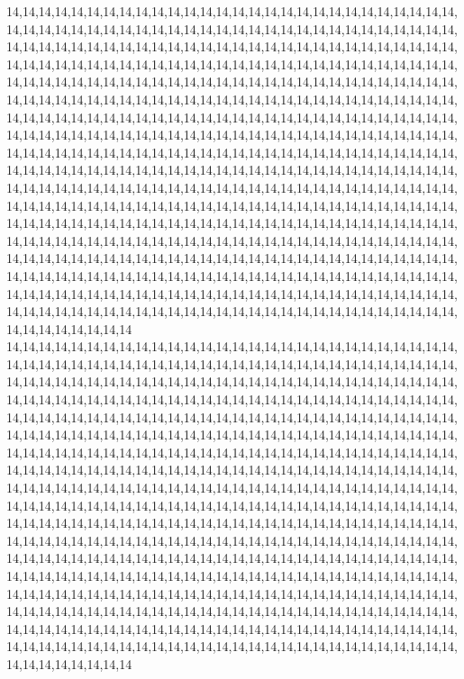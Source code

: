 14,14,14,14,14,14,14,14,14,14,14,14,14,14,14,14,14,14,14,14,14,14,14,14,14,14,14,14,14,14,14,14,14,14,14,14,14,14,14,14,14,14,14,14,14,14,14,14,14,14,14,14,14,14,14,14,14,14,14,14,14,14,14,14,14,14,14,14,14,14,14,14,14,14,14,14,14,14,14,14,14,14,14,14,14,14,14,14,14,14,14,14,14,14,14,14,14,14,14,14,14,14,14,14,14,14,14,14,14,14,14,14,14,14,14,14,14,14,14,14,14,14,14,14,14,14,14,14,14,14,14,14,14,14,14,14,14,14,14,14,14,14,14,14,14,14,14,14,14,14,14,14,14,14,14,14,14,14,14,14,14,14,14,14,14,14,14,14,14,14,14,14,14,14,14,14,14,14,14,14,14,14,14,14,14,14,14,14,14,14,14,14,14,14,14,14,14,14,14,14,14,14,14,14,14,14,14,14,14,14,14,14,14,14,14,14,14,14,14,14,14,14,14,14,14,14,14,14,14,14,14,14,14,14,14,14,14,14,14,14,14,14,14,14,14,14,14,14,14,14,14,14,14,14,14,14,14,14,14,14,14,14,14,14,14,14,14,14,14,14,14,14,14,14,14,14,14,14,14,14,14,14,14,14,14,14,14,14,14,14,14,14,14,14,14,14,14,14,14,14,14,14,14,14,14,14,14,14,14,14,14,14,14,14,14,14,14,14,14,14,14,14,14,14,14,14,14,14,14,14,14,14,14,14,14,14,14,14,14,14,14,14,14,14,14,14,14,14,14,14,14,14,14,14,14,14,14,14,14,14,14,14,14,14,14,14,14,14,14,14,14,14,14,14,14,14,14,14,14,14,14,14,14,14,14,14,14,14,14,14,14,14,14,14,14,14,14,14,14,14,14,14,14,14,14,14,14,14,14,14,14,14,14,14,14,14,14,14,14,14,14,14,14,14,14,14,14,14,14,14,14,14,14,14,14,14,14,14,14,14,14,14,14,14,14,14,14,14,14,14,14,14,14,14,14,14,14,14,14,14,14,14,14,14,14,14,14,14,14,14,14,14,14,14,14,14,14,14,14,14,14,14,14,14,14,14,14,14,14,14,14,14,14,14,14,14,14,14,14,14,14,14,14,14,14,14,14,14,14,14,14,14
14,14,14,14,14,14,14,14,14,14,14,14,14,14,14,14,14,14,14,14,14,14,14,14,14,14,14,14,14,14,14,14,14,14,14,14,14,14,14,14,14,14,14,14,14,14,14,14,14,14,14,14,14,14,14,14,14,14,14,14,14,14,14,14,14,14,14,14,14,14,14,14,14,14,14,14,14,14,14,14,14,14,14,14,14,14,14,14,14,14,14,14,14,14,14,14,14,14,14,14,14,14,14,14,14,14,14,14,14,14,14,14,14,14,14,14,14,14,14,14,14,14,14,14,14,14,14,14,14,14,14,14,14,14,14,14,14,14,14,14,14,14,14,14,14,14,14,14,14,14,14,14,14,14,14,14,14,14,14,14,14,14,14,14,14,14,14,14,14,14,14,14,14,14,14,14,14,14,14,14,14,14,14,14,14,14,14,14,14,14,14,14,14,14,14,14,14,14,14,14,14,14,14,14,14,14,14,14,14,14,14,14,14,14,14,14,14,14,14,14,14,14,14,14,14,14,14,14,14,14,14,14,14,14,14,14,14,14,14,14,14,14,14,14,14,14,14,14,14,14,14,14,14,14,14,14,14,14,14,14,14,14,14,14,14,14,14,14,14,14,14,14,14,14,14,14,14,14,14,14,14,14,14,14,14,14,14,14,14,14,14,14,14,14,14,14,14,14,14,14,14,14,14,14,14,14,14,14,14,14,14,14,14,14,14,14,14,14,14,14,14,14,14,14,14,14,14,14,14,14,14,14,14,14,14,14,14,14,14,14,14,14,14,14,14,14,14,14,14,14,14,14,14,14,14,14,14,14,14,14,14,14,14,14,14,14,14,14,14,14,14,14,14,14,14,14,14,14,14,14,14,14,14,14,14,14,14,14,14,14,14,14,14,14,14,14,14,14,14,14,14,14,14,14,14,14,14,14,14,14,14,14,14,14,14,14,14,14,14,14,14,14,14,14,14,14,14,14,14,14,14,14,14,14,14,14,14,14,14,14,14,14,14,14,14,14,14,14,14,14,14,14,14,14,14,14,14,14,14,14,14,14,14,14,14,14,14,14,14,14,14,14,14,14,14,14,14,14,14,14,14,14,14,14,14,14,14,14,14,14,14,14,14,14,14,14,14,14,14,14,14,14,14,14,14,14,14,14,14,14,14,14
